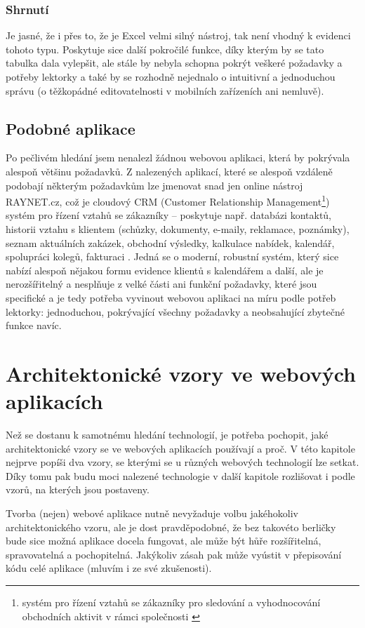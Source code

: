         \subsection{Shrnutí}
        Je jasné, že i přes to, že je Excel velmi silný nástroj, tak není vhodný k evidenci tohoto typu. Poskytuje sice další pokročilé funkce, díky kterým by se tato tabulka dala vylepšit, ale stále by nebyla schopna pokrýt veškeré požadavky a potřeby lektorky a také by se rozhodně nejednalo o intuitivní a jednoduchou správu (o těžkopádné editovatelnosti v mobilních zařízeních ani nemluvě).
    
    \section{Podobné aplikace}
    Po pečlivém hledání jsem nenalezl žádnou webovou aplikaci, která by pokrývala alespoň většinu požadavků. Z nalezených aplikací, které se alespoň vzdáleně podobají některým požadavkům lze jmenovat snad jen online nástroj RAYNET.cz, což je cloudový CRM (Customer Relationship Management\footnote{systém pro řízení vztahů se zákazníky pro sledování a vyhodnocování obchodních aktivit v rámci společnosti \cite{crm}}) systém pro řízení vztahů se zákazníky -- poskytuje např. databázi kontaktů, historii vztahu s klientem (schůzky, dokumenty, e-maily, reklamace, poznámky), seznam aktuálních zakázek, obchodní výsledky, kalkulace nabídek, kalendář, spolupráci kolegů, fakturaci \cite{raynet}. Jedná se o moderní, robustní systém, který sice nabízí alespoň nějakou formu evidence klientů s kalendářem a další, ale je nerozšířitelný a nesplňuje z velké části ani funkční požadavky, které jsou specifické a je tedy potřeba vyvinout webovou aplikaci na míru podle potřeb lektorky: jednoduchou, pokrývající všechny požadavky a neobsahující zbytečné funkce navíc.

\chapter{Architektonické vzory ve webových aplikacích}
Než se dostanu k samotnému hledání technologií, je potřeba pochopit, jaké architektonické vzory se ve webových aplikacích používají a proč. V této kapitole nejprve popíši dva vzory, se kterými se u různých webových technologií lze setkat. Díky tomu pak budu moci nalezené technologie v další kapitole rozlišovat i podle vzorů, na kterých jsou postaveny.

Tvorba (nejen) webové aplikace nutně nevyžaduje volbu jakéhokoliv architektonického vzoru, ale je dost pravděpodobné, že bez takovéto berličky bude sice možná aplikace docela fungovat, ale může být hůře rozšířitelná, spravovatelná a pochopitelná. Jakýkoliv zásah pak může vyústit v přepisování kódu celé aplikace (mluvím i ze své zkušenosti).

